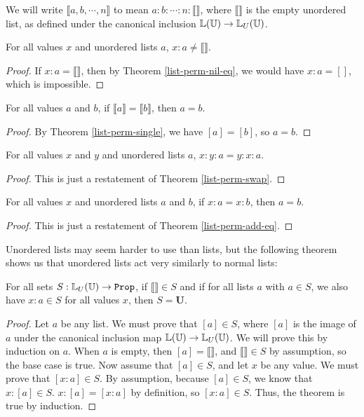 \documentclass[../math.tex]{subfiles}
\begin{document}
We will write $\llbracket a, b, \cdots, n\rrbracket$ to mean $a : b : \cdots : n
: \llbracket \rrbracket$, where $\llbracket \rrbracket$ is the empty unordered
list, as defined under the canonical inclusion $\mathbb{L}(\mathbb{U}) \to \mathbb{L}_U(\mathbb{U})$.

\begin{theorem} \label{ulist-end-neq}
    For all values $x$ and unordered lists $a$, $x : a \neq \llbracket
    \rrbracket$.
\end{theorem}
\begin{proof}
    If $x : a = \llbracket \rrbracket$, then by Theorem \ref{list-perm-nil-eq},
    we would have $x : a = []$, which is impossible.
\end{proof}

\begin{theorem} \label{ulist-single-eq}
    For all values $a$ and $b$, if $\llbracket a \rrbracket = \llbracket b
    \rrbracket$, then $a = b$.
\end{theorem}
\begin{proof}
    By Theorem \ref{list-perm-single}, we have $[a] = [b]$, so $a = b$.
\end{proof}

\begin{theorem} \label{ulist-swap}
    For all values $x$ and $y$ and unordered lists $a$, $x : y : a = y : x : a$.
\end{theorem}
\begin{proof}
    This is just a restatement of Theorem \ref{list-perm-swap}.
\end{proof}

\begin{theorem} \label{ulist-add-eq}
    For all values $x$ and unordered lists $a$ and $b$, if $x : a = x : b$, then
    $a = b$.
\end{theorem}
\begin{proof}
    This is just a restatement of Theorem \ref{list-perm-add-eq}.
\end{proof}

Unordered lists may seem harder to use than lists, but the following theorem
shows us that unordered lists act very similarly to normal lists:

\begin{theorem}
    For all sets $S : \set{\L_U(\U)}$, if $\llbracket\rrbracket \in S$ and if
    for all lists $a$ with $a \in S$, we also have $x : a \in S$ for all values
    $x$, then $S = \bm U$.
\end{theorem}
\begin{proof}
    Let $a$ be any list.  We must prove that $[a] \in S$, where $[a]$ is the
    image of $a$ under the canonical inclusion map $\mathbb{L}(\mathbb{U}) \to \mathbb{L}_U(\mathbb{U})$.  We
    will prove this by induction on $a$.  When $a$ is empty, then $[a] =
    \llbracket \rrbracket$, and $\llbracket \rrbracket \in S$ by assumption, so
    the base case is true.  Now assume that $[a] \in S$, and let $x$ be any
    value.  We must prove that $[x : a] \in S$.  By assumption, because $[a] \in
    S$, we know that $x : [a] \in S$.  $x : [a] = [x : a]$ by definition, so $[x
    : a] \in S$.  Thus, the theorem is true by induction.
\end{proof}
\end{document}
